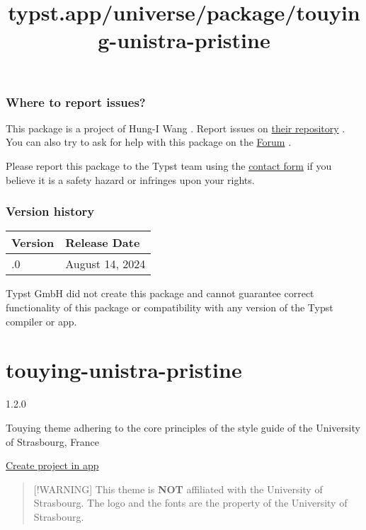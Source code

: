 \subsubsection{Where to report issues?}\label{where-to-report-issues}

This package is a project of Hung-I Wang . Report issues on
\href{https://github.com/Gowee/typst-clatter}{their repository} . You
can also try to ask for help with this package on the
\href{https://forum.typst.app}{Forum} .

Please report this package to the Typst team using the
\href{https://typst.app/contact}{contact form} if you believe it is a
safety hazard or infringes upon your rights.

\label{versions}
\subsubsection{Version history}\label{version-history}

\begin{longtable}[]{@{}ll@{}}
\toprule\noalign{}
Version & Release Date \\
\midrule\noalign{}
\endhead
\bottomrule\noalign{}
\endlastfoot
0.1.0 & August 14, 2024 \\
\end{longtable}

Typst GmbH did not create this package and cannot guarantee correct
functionality of this package or compatibility with any version of the
Typst compiler or app.


\title{typst.app/universe/package/touying-unistra-pristine}

\label{banner}
\label{template-thumbnail}

\section{touying-unistra-pristine}\label{touying-unistra-pristine}

{ 1.2.0 }

Touying theme adhering to the core principles of the style guide of the
University of Strasbourg, France

\href{/app?template=touying-unistra-pristine&version=1.2.0}{Create
project in app}

\label{readme}
\begin{quote}
{[}!WARNING{]} This theme is \textbf{NOT} affiliated with the University
of Strasbourg. The logo and the fonts are the property of the University
of Strasbourg.
\end{quote}

